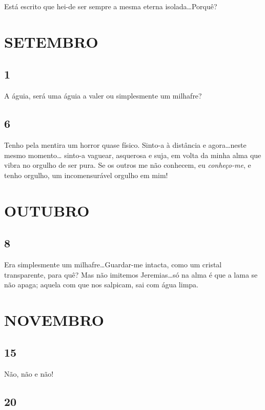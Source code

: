 Está escrito que hei-de ser sempre a mesma eterna
isolada\ldots Porquê?

\section{SETEMBRO}

\subsection{1} 

A águia, será uma águia a valer ou simplesmente
um milhafre?

\subsection{6} 

Tenho pela mentira um horror quase físico. 
Sinto-a à distância e agora\ldots neste mesmo momento\ldots
sinto-a vaguear, asquerosa e suja, em volta da minha
alma que vibra no orgulho de ser pura. Se os outros
me não conhecem, eu \textit{conheço-me}, e tenho orgulho,
um incomensurável orgulho em mim!

\section{OUTUBRO}

\subsection{8} 

Era simplesmente um milhafre\ldots Guardar-me
intacta, como um cristal transparente, para quê? Mas
não imitemos Jeremias\ldots só na alma é que a lama se
não apaga; aquela com que nos salpicam, sai com água
limpa.

\section{NOVEMBRO}

\subsection{15} 

Não, não e não!

\subsection{20} 

